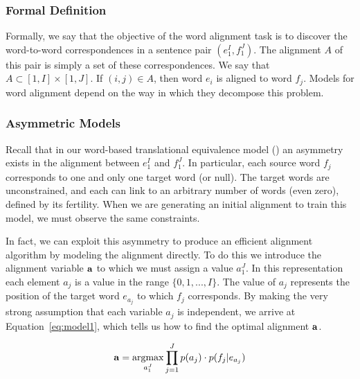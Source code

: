 \subsubsection{Formal Definition}\label{sec:wa-formal-definition}
Formally, we say that the objective of the word alignment 
task is to discover the word-to-word correspondences in
a sentence pair $(e_1^I,f_1^J)$.  The alignment $A$ of 
this pair is simply a set of these correspondences.
We say that $A \subset [1,I] \times [1,J]$.
If $(i,j) \in A$, then word $e_i$ is aligned to word $f_j$.
Models for word alignment depend on the way in which they
decompose this problem.

\subsubsection{Asymmetric Models}\label{sec:asymmetric-models}

Recall that in our word-based translational equivalence model
() an asymmetry 
exists in the alignment between $e_1^I$ and $f_1^J$.  In 
particular, each source word $f_j$ corresponds 
to one and only one target word (or null).
The target words are unconstrained, 
and each can link to an arbitrary number of
words (even zero), defined by its fertility.  
When we are generating an initial alignment to train 
this model, we must observe the same constraints.

In fact, we can exploit this asymmetry to produce 
an efficient alignment algorithm by
modeling the  alignment directly.  To do this 
we introduce the alignment variable ${\bf a}$ 
to which we must assign a value $a_1^J$.
In this representation each element $a_j$ is 
a value in the range $\{0,1,...,I\}$.
The value of $a_j$ represents the position of the 
target word $e_{a_j}$ to which $f_j$ corresponds.  
By making the very strong assumption that each 
variable $a_j$ is independent, we arrive at 
Equation~\ref{eq:model1}, which tells us how
to find the optimal alignment ${\bf a}$.

\begin{equation}\label{eq:model1}
\avar = \argmax_{a_1^J} \prod_{j=1}^J p(a_j) \cdot p(f_j|e_{a_j})
\end{equation}

